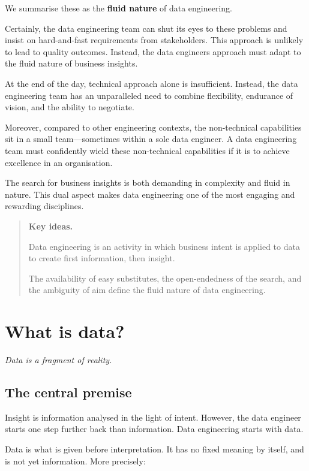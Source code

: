\documentclass[10pt,openany,10pt]{book}
\begin{document}
We summarise these as the \textbf{fluid nature} of data engineering.

Certainly, the data engineering team can shut its eyes to these problems
and insist on hard-and-fast requirements from stakeholders. This
approach is unlikely to lead to quality outcomes. Instead, the data
engineer\textquotesingle s approach must adapt to the fluid nature of
business insights.

At the end of the day, technical approach alone is insufficient.
Instead, the data engineering team has an unparalleled need to combine
flexibility, endurance of vision, and the ability to negotiate.

Moreover, compared to other engineering contexts, the non-technical
capabilities sit in a small team---sometimes within a sole data
engineer. A data engineering team must confidently wield these
non-technical capabilities if it is to achieve excellence in an
organisation.

The search for business insights is both demanding in complexity and
fluid in nature. This dual aspect makes data engineering one of the most
engaging and rewarding disciplines.

\begin{quote}
\textbf{Key ideas.}

Data engineering is an activity in which business intent is applied to
data to create first information, then insight.

The availability of easy substitutes, the open-endedness of the search,
and the ambiguity of aim define the fluid nature of data engineering.
\end{quote}

\newpage

\chapter{What is data?}\label{docs-foundations-what-is-data}

\emph{Data is a fragment of reality.}

\section{The central premise}\label{the-central-premise}

Insight is information analysed in the light of intent. However, the
data engineer starts one step further back than information. Data
engineering starts with data.

Data is what is given before interpretation. It has no fixed meaning by
itself, and is not yet information. More precisely:
\end{document}
